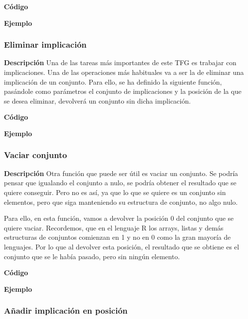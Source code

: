     \textbf{C\'odigo}


    \textbf{Ejemplo}




\subsubsection{Eliminar implicaci\'on}

    \textbf{Descripci\'on}
    Una de las tareas m\'as importantes de este TFG es trabajar con implicaciones. Una de las operaciones m\'as habituales 
    va a ser la de eliminar una implicaci\'on de un conjunto. Para ello, se ha definido la siguiente funci\'on, pas\'andole 
    como par\'ametros el conjunto de implicaciones y la posici\'on de la que se desea eliminar, devolver\'a un conjunto sin 
    dicha implicaci\'on.

    \textbf{C\'odigo}


    \textbf{Ejemplo}



\subsubsection{Vaciar conjunto}

    \textbf{Descripci\'on}
    Otra funci\'on que puede ser \'util es vaciar un conjunto. Se podr\'ia pensar que igualando el conjunto a nulo, 
    se podr\'ia obtener el resultado que se quiere conseguir. Pero no es as\'i, ya que lo que se quiere es un conjunto sin 
    elementos, pero que siga manteniendo su estructura de conjunto, no algo nulo. 
    
    Para ello, en esta funci\'on, vamos a devolver la posici\'on 0 del conjunto que se quiere vaciar. Recordemos, que en el 
    lenguaje R los arrays, listas y dem\'as estructuras de conjuntos comienzan en 1 y no en 0 como la gran mayor\'ia de lenguajes.
    Por lo que al devolver esta posici\'on, el resultado que se obtiene es el conjunto que se le hab\'ia pasado, pero sin ning\'un 
    elemento.

    \textbf{C\'odigo}


    \textbf{Ejemplo}



\subsubsection{A\~nadir implicaci\'on en posici\'on}

